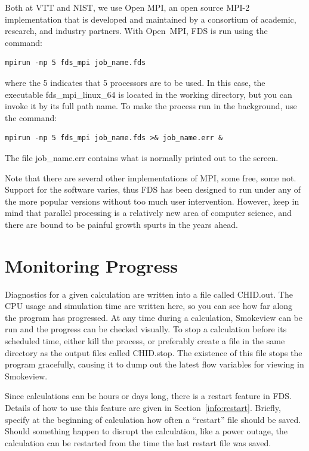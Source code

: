 \documentclass[11pt]{book}
\begin{document}
Both at VTT and NIST, we use Open MPI, an open source MPI-2 implementation that is developed and maintained by a consortium of academic,
research, and industry partners.
With Open~MPI, FDS is run using the command:
\begin{lstlisting}
mpirun -np 5 fds_mpi job_name.fds
\end{lstlisting}
where the 5 indicates that 5 processors are to be used. In this case, the executable {\ct fds\_mpi\_linux\_64} is located in the
working directory, but you can invoke it by its full path name. To make the process run in the background, use the command:
\begin{lstlisting}
mpirun -np 5 fds_mpi job_name.fds >& job_name.err &
\end{lstlisting}
The file {\ct job\_name.err} contains what is normally printed out to the screen.

Note that there are several other implementations of MPI, some free, some not.
Support for the software varies, thus FDS has been designed to run under any of the
more popular versions without too much user intervention. However, keep in mind
that parallel processing is a relatively new area of computer science,
and there are bound to be painful growth spurts in the years ahead.




\section{Monitoring Progress}

Diagnostics for a given calculation are written into a file called {\ct CHID.out}.
The CPU usage and simulation time are written here, so you can see how
far along the program has progressed. At any time during a calculation,
Smokeview can be run and the progress can be checked visually.
To stop a calculation before its scheduled time, either
kill the process, or preferably create a file in the same directory as
the output files called {\ct CHID.stop}. The existence of this
file stops the program gracefully, causing it to dump out the
latest flow variables for viewing in Smokeview.

Since calculations can be hours or days long, there is a restart
feature in FDS. Details of how to use this feature
are given in Section~\ref{info:restart}. Briefly, specify at the
beginning of calculation how often a ``restart'' file should be saved.
Should something happen to disrupt the calculation, like a power
outage, the calculation can be restarted from the time the last restart
file was saved.
\end{document}
